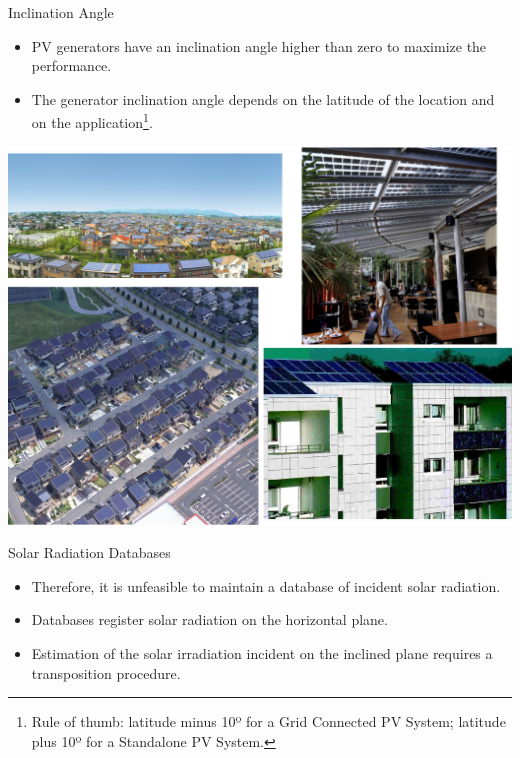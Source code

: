 \documentclass[xcolor={usenames,svgnames,dvipsnames}]{beamer}
\begin{document}
\begin{frame}[label={sec:org54eefe6}]{Inclination Angle}
\begin{itemize}
\item PV generators have an \alert{inclination angle higher than zero} to maximize the performance.
\item The generator inclination angle depends on the latitude of the location and on the application\footnote{Rule of thumb: latitude minus 10º for a Grid Connected PV System; latitude plus 10º for a Standalone PV System.}.
\end{itemize}

\begin{center}
\includegraphics[height=0.5\textheight]{../figs/PVUrban.png}
\end{center}
\end{frame}

\begin{frame}[label={sec:org353cb63}]{Solar Radiation Databases}
\begin{itemize}
\item Therefore, it is unfeasible to maintain a database of incident solar radiation.
\item Databases register solar radiation on the horizontal plane.
\item Estimation of the solar irradiation \alert{incident on the inclined plane} requires a transposition procedure.
\end{itemize}
\end{frame}
\end{document}
